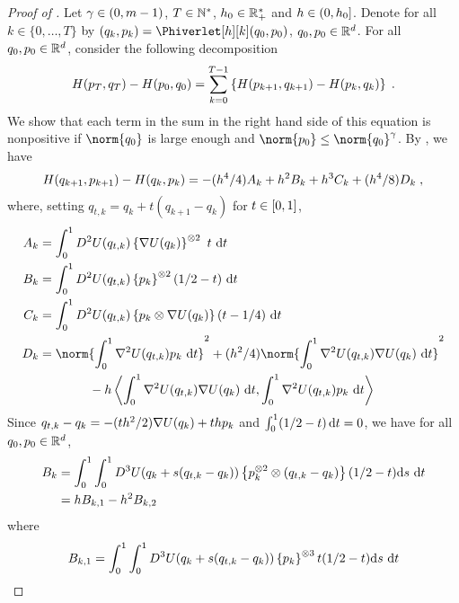 \begin{proof}[Proof of ]
Let $\gamma \in \left(0,m-1\right)$, $T \in \mathbb{N}^{*}$, $h_0 \in \mathbb{R}_+^*$ and  $h \in \left(0,h_0\right]$.
Denote for all $k \in \{0,\ldots,T\}$ by $(q_k,p_k) =
  \Phiverlet[h][k](q_0,p_0)$, $q_0, p_0 \in \mathbb{R}^d$.
  For all $q_0,p_0 \in \mathbb{R}^d$, consider the following decomposition
\begin{equation}
  \label{eq:diff_ham_decompo}
H(p_T,q_T)-H(p_0,q_0)=\sum_{k=0}^{T-1}\left\lbrace H(p_{k+1},q_{k+1})-H(p_{k},q_{k}) \right\rbrace \;.
\end{equation}
We show that each term in the sum in the right hand side of this equation is nonpositive if $\norm{\q_0}$ is large enough and $\norm{p_0} \leq \norm{q_0}^{\gamma}$.
By , we have
\begin{equation}
\label{eq:diff_ham_k}
H(q_{k+1},p_{k+1})-H(q_{k},p_{k})
= -(h^4/4)A_k+h^2 B_k+ h^3C_k+(h^4/8) D_k \;,
\end{equation}
where, setting $q_{t,k}= q_k + t(q_{k+1}-q_k)$ for $t \in \left[0,1\right]$,
\begin{align}
  A_k &=\int_0^1 D^2\F(q_{t,k})\defEns{\nabla \F(q_{k})}^{\otimes 2} \ t \  \rmd t \\
B_k& = \int_0^1D^2\F(q_{t,k})\defEns{p_{k}}^{\otimes 2} (1/2-t) \  \rmd t \\
C_k & = \int_0^1D^2\F(q_{t,k})\defEns{p_{k}\otimes \nabla \F(q_{k})}(t-1/4) \ \rmd t \\
D_k & = \norm{ \int_0^1 \nabla ^2 \F( q_{t,k}) p_{k} \ \rmd t  }^2 +(h^2/4)\norm{\int_0^1 \nabla^2 \F( q_{t,k})\nabla \F (q_{k}) \ \rmd t }^2 \\
& \qquad \qquad -  h \ps{\int_0^1\nabla^2\F(q_{t,k})\nabla \F(q_{k}) \ \rmd t }{\int_0^1 \nabla^2 \F(q_{t,k})p_{k} \ \rmd t }
\end{align}
Since $q_{t,k}-q_k= -(t h^2/2) \nabla U(q_k) + th p_k$ and $\int_{0}^1(1/2-t) \, \mathrm{d} t = 0$, we have
for all $q_0,p_0 \in \mathbb{R}^d$,
\begin{align}
B_k &= \int_{0}^1 \int_0^1 D^3 U(q_{k} +s(q_{t,k} - q_{k})) \left\lbrace p_{k}^{\otimes 2} \otimes (q_{t,k}-q_{k}) \right\rbrace (1/2-t)\mathrm{d} s \ \mathrm{d} t 
  \\
  \label{eq:definition-B_k}
    &= h B_{k,1} - h^2 B_{k,2}
\end{align}
where
\begin{align}
\label{eq:definition-B_k-1}
B_{k,1} &= \int_{0}^1 \int_0^1 D^3 \F(q_{k} +s(q_{t,k} - q_{k})) \defEns{p_{k}}^{\otimes 3}t (1/2-t)\rmd s \ \rmd t \\

\end{align}
\end{proof}
